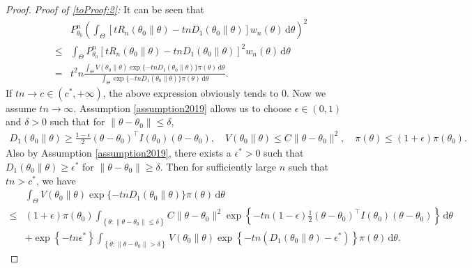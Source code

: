 \documentclass[11pt]{article}
\newcommand{\myT}{\intercal}
\theoremstyle{plain}
\theoremstyle{definition}
\theoremstyle{remark}
\begin{document}
\begin{appendices}
\begin{proof}
\noindent\emph{Proof of \eqref{toProof:2}:}
It can be seen that
\begin{align*}
    &
    P_{\theta_0}^n
    \left( 
    \int_{\Theta}
    \left[   t R_n(\theta_0\| \theta) - tn D_1 (\theta_0 \| \theta )  \right]
    w_n (\theta) \, \mathrm d \theta
    \right)^2
    \\
    \leq&
    \int_{\Theta}
    P_{\theta_0}^n
    \left[   t R_n(\theta_0\| \theta) - tn D_1 (\theta_0 \| \theta )  \right]^2
    w_n (\theta) \, \mathrm d \theta
    \\
    =&
        t^2 n
           \frac{
    \int_{\Theta}
     V(\theta_0 \| \theta)
               \exp\{ -t n D_1\left( \theta_0 \| \theta \right) \} \pi(\theta)
     \, \mathrm d \theta
           }{
               \int_{\Theta} \exp\{ -t n D_1\left( \theta_0 \| \theta \right) \} \pi(\theta) \, \mathrm d \theta
           }
           .
\end{align*}
If $tn \to c \in (c^*, +\infty)$, the above expression obviously tends to $0$.
Now we assume $tn \to \infty$.
Assumption \ref{assumption2019} allows us to choose $\epsilon \in (0,1)$ and $\delta>0$ such that  for $\|\theta- \theta_0\| \leq \delta$,
\begin{align*}
    D_1(\theta_0 \| \theta) \geq  \frac{1-\epsilon}{2} (\theta- \theta_0)^\myT I(\theta_0) (\theta - \theta_0),
    \quad
    V(\theta_0 \| \theta) \leq C\|\theta - \theta_0\|^2
    ,\quad
    \pi(\theta) \leq (1+\epsilon) \pi(\theta_0)
    .
\end{align*}
Also by Assumption \ref{assumption2019}, there exists a $\epsilon^* > 0$ such that $D_1(\theta_0 \|\theta) \geq \epsilon^*$ for $\|\theta - \theta_0\| \geq \delta$.
Then for sufficiently large $n$ such that $tn > c^*$, we have
\begin{align*}
    &
    \int_{\Theta}
     V(\theta_0 \| \theta)
               \exp\{ -t n D_1\left( \theta_0 \| \theta \right) \} \pi(\theta)
     \, \mathrm d \theta
     \\
     \leq&
    (1+\epsilon) \pi(\theta_0)
     \int_{ \left\{ \theta: \|\theta- \theta_0\| \leq \delta \right\}}
     C\|\theta - \theta_0\|^2
     \exp\left\{ -t n (1-\epsilon) \frac{1}{2} \left( \theta - \theta_0 \right)^\myT I(\theta_0) (\theta- \theta_0) \right\} 
     \, \mathrm d \theta
     \\
     &+
     \exp\left\{ -tn \epsilon^* \right\} 
     \int_{\left\{ \theta: \|\theta- \theta_0\| > \delta \right\}} V(\theta_0 \| \theta) \exp\left\{ -tn \left( D_1 \left( \theta_0 \| \theta \right) - \epsilon^* \right) \right\} \pi(\theta) \, \mathrm d \theta.

\end{align*}
\end{proof}
\end{appendices}
\end{document}
